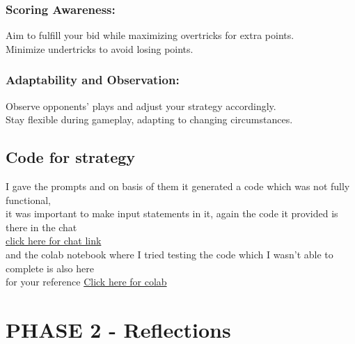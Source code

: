 \documentclass[12 pt]{report}
\begin{document}
\subsection{Scoring Awareness:}
Aim to fulfill your bid while maximizing overtricks for extra points. \\
Minimize undertricks to avoid losing points. \\
\subsection{Adaptability and Observation:}
Observe opponents' plays and adjust your strategy accordingly. \\
Stay flexible during gameplay, adapting to changing circumstances. \\

\section{Code for strategy}
I gave the prompts and on basis of them it generated a code which was not fully functional,\\
 it was important to make input statements in it, again the code it provided is there in the chat\\
\href{https://www.perplexity.ai/search/do-you-know-gHKgfZmeSsy.cOMl1H1eSQ}{click here for chat link} \\
and the colab notebook where I tried testing the code which I wasn't able to complete is also here \\
for your reference \href{https://colab.research.google.com/drive/1tZvJel6zhkuNIAAIm-4oVlGKxWTS50MF?usp=sharing}{Click here for colab} \\


\chapter{PHASE 2 - Reflections}
\end{document}
